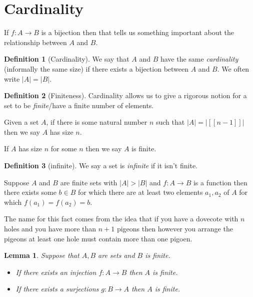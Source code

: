 \documentclass[
]{book}
\newtheorem{lemma}{Lemma}[chapter]
\theoremstyle{definition}
\newtheorem{definition}{Definition}[chapter]
\theoremstyle{definition}
\theoremstyle{definition}
\theoremstyle{definition}
\theoremstyle{remark}
\begin{document}
\section{Cardinality}\label{cardinality}

If \(f: A \rightarrow B\) is a bijection then that tells us something important about the relationship between \(A\) and \(B\).

\begin{definition}[Cardinality]
We say that \(A\) and \(B\) have the same \emph{cardinality} (informally the same size) if there exists a bijection between \(A\) and \(B\). We often write \(|A| = |B|\).
\end{definition}

\begin{definition}[Finiteness]
Cardinality allows us to give a rigorous notion for a set to be \emph{finite}/have a finite number of elements.

Given a set \(A\), if there is some natural number \(n\) such that \(|A|=|[[n-1]]|\) then we say \(A\) has size \(n\).

If \(A\) has size \(n\) for some \(n\) then we say \(A\) is finite.
\end{definition}

\begin{definition}[infinite]
We say a set is \emph{infinite} if it isn't finite.
\end{definition}

Suppose \(A\) and \(B\) are finite sets with \(|A| > |B|\) and \(f: A \rightarrow B\) is a function then there exists some \(b \in B\) for which there are at least two elements \(a_1,a_2\) of \(A\) for which \(f(a_1)=f(a_2)=b\).

The name for this fact comes from the idea that if you have a dovecote with \(n\) holes and you have more than \(n+1\) pigeons then however you arrange the pigeons at least one hole must contain more than one pigoen.

\begin{lemma}

Suppose that \(A,B\) are sets and \(B\) is finite.

\begin{itemize}
\item
  If there exists an injection \(f: A \rightarrow B\) then \(A\) is finite.
\item
  If there exists a surjections \(g: B \rightarrow A\) then \(A\) is finite.
\end{itemize}

\end{lemma}
\end{document}
